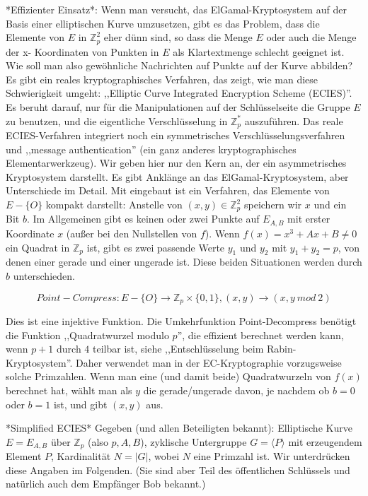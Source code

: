 \documentclass[a4paper]{article}
\begin{document}
\begin{multicols}{3}
    *Effizienter Einsatz*: Wenn man versucht, das ElGamal-Kryptosystem auf der Basis einer elliptischen Kurve umzusetzen, gibt es das Problem, dass die Elemente von $E$ in $\mathbb{Z}^2_p$ eher dünn sind, so dass die Menge $E$ oder auch die Menge der x-
    Koordinaten von Punkten in $E$ als Klartextmenge schlecht geeignet ist. Wie soll man also gewöhnliche Nachrichten auf Punkte auf der Kurve abbilden? Es gibt ein reales kryptographisches Verfahren, das zeigt, wie man diese Schwierigkeit umgeht: ,,Elliptic Curve Integrated Encryption Scheme (ECIES)''. Es beruht darauf, nur für die Manipulationen auf der Schlüsselseite die Gruppe $E$ zu benutzen, und die eigentliche Verschlüsselung in $\mathbb{Z}^*_p$ auszuführen. Das reale ECIES-Verfahren integriert noch ein symmetrisches Verschlüsselungsverfahren und ,,message authentication'' (ein ganz anderes kryptographisches Elementarwerkzeug). Wir geben hier nur den Kern an, der ein asymmetrisches Kryptosystem darstellt. Es gibt Anklänge an das ElGamal-Kryptosystem, aber Unterschiede im Detail.
    Mit eingebaut ist ein Verfahren, das Elemente von $E-\{O\}$ kompakt darstellt: Anstelle von $(x,y)\in\mathbb{Z}^2_p$ speichern wir $x$ und ein Bit $b$. Im Allgemeinen gibt es keinen oder zwei Punkte auf $E_{A,B}$ mit erster Koordinate $x$ (außer bei den Nullstellen von $f$). Wenn $f(x)=x^3+Ax+B\not= 0$ ein Quadrat in $\mathbb{Z}_p$ ist, gibt es zwei passende Werte $y_1$ und $y_2$ mit $y_1+y_2=p$, von denen einer gerade und einer ungerade ist. Diese beiden Situationen werden durch $b$ unterschieden.

    $$Point-Compress: E-\{O\}\rightarrow\mathbb{Z}_p \times\{0,1\},(x,y)\rightarrow (x,y\ mod\ 2)$$

    Dies ist eine injektive Funktion. Die Umkehrfunktion Point-Decompress benötigt die Funktion ,,Quadratwurzel modulo $p$'', die effizient berechnet werden kann, wenn $p+1$ durch $4$ teilbar ist, siehe ,,Entschlüsselung beim Rabin-Kryptosystem''. Daher verwendet man in der EC-Kryptographie vorzugsweise solche Primzahlen. Wenn man eine (und damit beide) Quadratwurzeln von $f(x)$ berechnet hat, wählt man als $y$ die gerade/ungerade davon, je nachdem ob $b=0$ oder $b=1$ ist, und gibt $(x,y)$ aus.

    *Simplified ECIES*
    Gegeben (und allen Beteiligten bekannt): Elliptische Kurve $E=E_{A,B}$ über $\mathbb{Z}_p$ (also $p,A,B$), zyklische Untergruppe $G=\langle P\rangle $ mit erzeugendem Element $P$, Kardinalität $N=|G|$, wobei $N$ eine Primzahl ist. Wir unterdrücken diese Angaben im Folgenden.
    (Sie sind aber Teil des öffentlichen Schlüssels und natürlich auch dem Empfänger Bob bekannt.)


\end{multicols}
\end{document}
